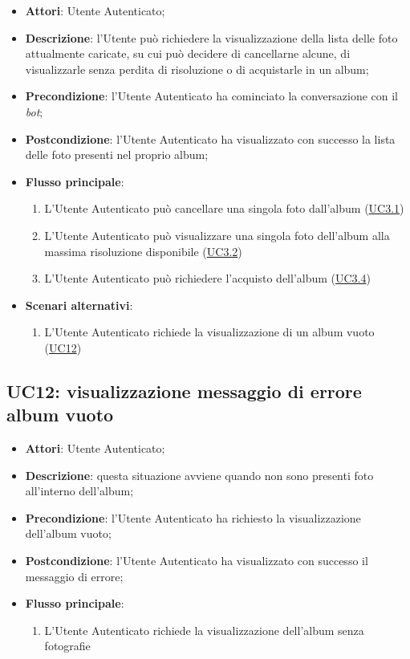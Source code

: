 \begin{itemize}
  \item \textbf{Attori}: Utente Autenticato;
  \item \textbf{Descrizione}: l'Utente può richiedere la visualizzazione della
lista delle foto attualmente caricate, su cui può decidere di cancellarne
alcune, di visualizzarle senza perdita di risoluzione o di acquistarle in un
album;
  \item \textbf{Precondizione}: l'Utente Autenticato ha cominciato la
conversazione con il \textit{bot};
  \item \textbf{Postcondizione}: l'Utente Autenticato ha visualizzato con
successo la lista delle foto presenti nel proprio album;
  \item \textbf{Flusso principale}:
  \begin{enumerate}
    \item L'Utente Autenticato può cancellare una singola foto dall'album
(\hyperlink{UC3.1}{UC3.1})
    \item L'Utente Autenticato può visualizzare una singola foto dell'album alla
massima risoluzione disponibile (\hyperlink{UC3.2}{UC3.2})
    \item L'Utente Autenticato può richiedere l'acquisto dell'album
(\hyperlink{UC3.4}{UC3.4})
  \end{enumerate}
  \item \textbf{Scenari alternativi}:
  \begin{enumerate}
    \item L'Utente Autenticato richiede la visualizzazione di un album vuoto
(\hyperlink{UC12}{UC12})
  \end{enumerate}
\end{itemize}



\subsection{UC12: visualizzazione messaggio di errore album vuoto}
\label{uc:uc12}
\hypertarget{UC12}{}

\begin{itemize}
  \item \textbf{Attori}: Utente Autenticato;
  \item \textbf{Descrizione}: questa situazione avviene quando non sono
presenti foto all'interno dell'album;
  \item \textbf{Precondizione}: l'Utente Autenticato ha richiesto la
visualizzazione dell'album vuoto;
  \item \textbf{Postcondizione}: l'Utente Autenticato ha visualizzato con
successo il messaggio di errore;
  \item \textbf{Flusso principale}:
  \begin{enumerate}
    \item L'Utente Autenticato richiede la visualizzazione dell'album senza
fotografie
  \end{enumerate}
\end{itemize}



